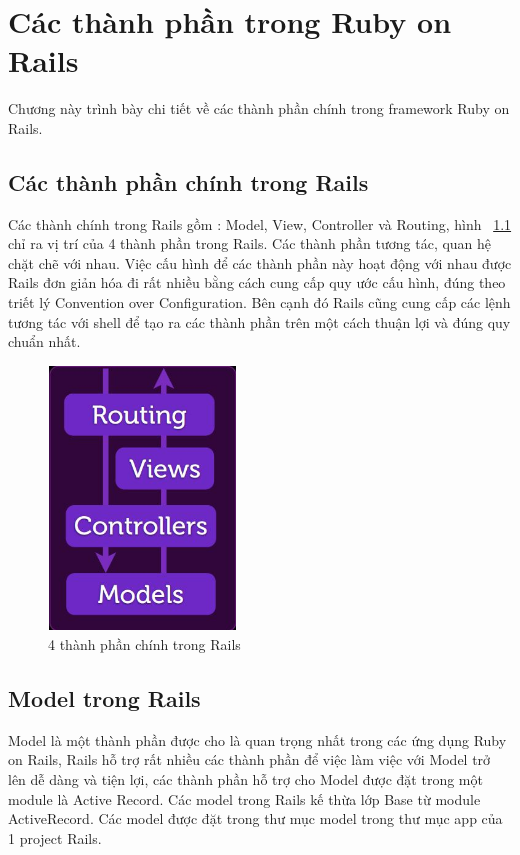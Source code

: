 \chapter{Các thành phần trong Ruby on Rails}
Chương này trình bày chi tiết về các thành phần chính trong framework Ruby on Rails.


\section{Các thành phần chính trong Rails}
Các thành chính trong Rails gồm : Model, View, Controller và Routing, hình ~\ref{fig:4c} chỉ ra vị trí của 4 thành phần trong Rails. Các thành phần tương tác, quan hệ chặt chẽ với nhau. Việc cấu hình để các thành phần này hoạt động với nhau được Rails đơn giản hóa đi rất nhiều bằng cách cung cấp quy ước cấu hình, đúng theo triết lý Convention over Configuration. Bên cạnh đó Rails cũng cung cấp các lệnh tương tác với shell để tạo ra các thành phần trên một cách thuận lợi và đúng quy chuẩn nhất. 
\begin{figure}
	\centering
		\includegraphics[width=5cm, height=7cm]{image/4c.JPG}
	\caption{4 thành phần chính trong Rails}
	\label{fig:4c}
\end{figure}

\section{Model trong Rails}
Model là một thành phần được cho là quan trọng nhất trong các ứng dụng Ruby on Rails, Rails hỗ trợ rất nhiều các thành phần để việc làm việc với Model trở lên dễ dàng và tiện lợi, các thành phần hỗ trợ cho Model được đặt trong một module là Active Record. Các model trong Rails kế thừa lớp Base từ module ActiveRecord. Các model được đặt trong thư mục model trong thư mục app của 1 project Rails.

